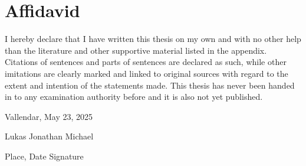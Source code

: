 \chapter*{Affidavid}
\thispagestyle{empty} %

I hereby declare that I have written this thesis on my own and with no other help than the literature and other supportive material listed in the appendix. Citations of sentences and parts of sentences are declared as such, while other imitations are clearly marked and linked to original sources with regard to the extent and intention of the statements made. This thesis has never been handed in to any examination authority before and it is also not yet published.


Vallendar, May 23, 2025

Lukas Jonathan Michael


\vspace{4cm}

\hspace{2cm} Place, Date \hfill Signature \hspace{2cm}